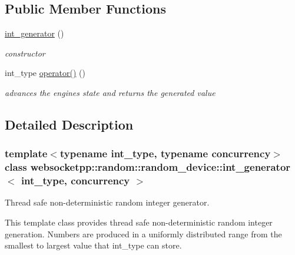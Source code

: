 \subsection*{Public Member Functions}
\begin{DoxyCompactItemize}
\item 
\mbox{\label{classwebsocketpp_1_1random_1_1random__device_1_1int__generator_ac1752f1f3cb1c3cb6a98e252b6baac8a}} 
\mbox{\hyperlink{classwebsocketpp_1_1random_1_1random__device_1_1int__generator_ac1752f1f3cb1c3cb6a98e252b6baac8a}{int\+\_\+generator}} ()
\begin{DoxyCompactList}\small\item\em constructor \end{DoxyCompactList}\item 
\mbox{\label{classwebsocketpp_1_1random_1_1random__device_1_1int__generator_a6e4fea3c83b876cc364f9d9370b0c5a1}} 
int\+\_\+type \mbox{\hyperlink{classwebsocketpp_1_1random_1_1random__device_1_1int__generator_a6e4fea3c83b876cc364f9d9370b0c5a1}{operator()}} ()
\begin{DoxyCompactList}\small\item\em advances the engine\textquotesingle{}s state and returns the generated value \end{DoxyCompactList}\end{DoxyCompactItemize}


\subsection{Detailed Description}
\subsubsection*{template$<$typename int\+\_\+type, typename concurrency$>$\newline
class websocketpp\+::random\+::random\+\_\+device\+::int\+\_\+generator$<$ int\+\_\+type, concurrency $>$}

Thread safe non-\/deterministic random integer generator. 

This template class provides thread safe non-\/deterministic random integer generation. Numbers are produced in a uniformly distributed range from the smallest to largest value that int\+\_\+type can store.

